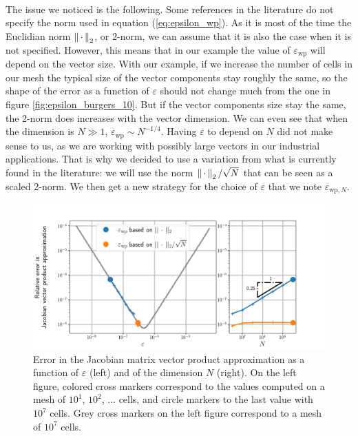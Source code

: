       \paragraph{}
      The issue we noticed is the following.
      Some references in the literature do not specify the norm used in equation (\ref{eq:epsilon_wp}).
      As it is most of the time the Euclidian norm $\norm[2]{\,\cdot\,}$, or 2-norm, we can assume that it is also the case when it is not specified.
      However, this means that in our example the value of $\varepsilon_\textrm{wp}$ will depend on the vector size.
      With our example, if we increase the number of cells in our mesh the typical size of the vector components stay roughly the same, so the shape of the error as a function of $\varepsilon$ should not change much from the one in figure \ref{fig:epsilon_burgers_10}.
      But if the vector components size stay the same, the 2-norm does increases with the vector dimension.
      We can even see that when the dimension is $N \gg 1$, $\varepsilon_\textrm{wp} \sim N^{-1/4}$.
      Having $\varepsilon$ to depend on $N$ did not make sense to us, as we are working with possibly large vectors in our industrial applications.
      That is why we decided to use a variation from what is currently found in the literature: we will use the norm $\norm[2]{\,\cdot\,} / \sqrt{N}$ that can be seen as a scaled 2-norm.
      We then get a new strategy for the choice of $\varepsilon$ that we note $\varepsilon_{\textrm{wp}, N}$.

      \begin{figure}
        \centering
        \includegraphics[width=\textwidth]{figures/epsilon_Burgers.png}
        \caption{
          Error in the Jacobian matrix vector product approximation as a function of $\varepsilon$ (left) and of the dimension $N$ (right).
          On the left figure, colored cross markers correspond to the values computed on a mesh of $10^1$, $10^2$, ... cells, and circle markers to the last value with $10^7$ cells.
          Grey cross markers on the left figure correspond to a mesh of $10^7$ cells.
        }
        \label{fig:epsilon_burgers}
      \end{figure}

